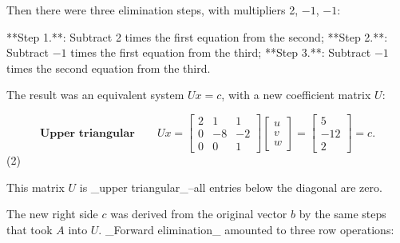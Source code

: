 Then there were three elimination steps, with multipliers 2, \(-1\), \(-1\):

**Step 1.**: Subtract 2 times the first equation from the second;
**Step 2.**: Subtract \(-1\) times the first equation from the third;
**Step 3.**: Subtract \(-1\) times the second equation from the third.

The result was an equivalent system \(Ux=c\), with a new coefficient matrix \(U\):

\[\textbf{Upper triangular}\qquad Ux=\begin{bmatrix}2&1&1\\ 0&-8&-2\\ 0&0&1\end{bmatrix}\begin{bmatrix}u\\ v\\ w\end{bmatrix}=\begin{bmatrix}5\\ -12\\ 2\end{bmatrix}=c.\] (2)

This matrix \(U\) is _upper triangular_--all entries below the diagonal are zero.

The new right side \(c\) was derived from the original vector \(b\) by the same steps that took \(A\) into \(U\). _Forward elimination_ amounted to three row operations:
